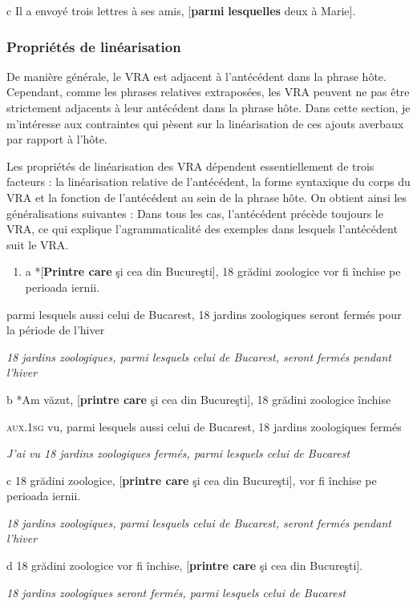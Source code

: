  c  Il a envoyé trois lettres à ses amis, [\textbf{parmi} \textbf{lesquelles} deux à Marie].

\subsubsection{Propriétés de linéarisation}
De manière générale, le VRA est adjacent à l'antécédent dans la phrase hôte. Cependant, comme les phrases relatives extraposées, les VRA peuvent ne pas être strictement adjacents à leur antécédent dans la phrase hôte. Dans cette section, je m'intéresse aux contraintes qui pèsent sur la linéarisation de ces ajouts averbaux par rapport à l'hôte.

Les propriétés de linéarisation des VRA dépendent essentiellement de trois facteurs : la linéarisation relative de l'antécédent, la forme syntaxique du corps du VRA et la fonction de l'antécédent au sein de la phrase hôte. On obtient ainsi les généralisations suivantes : Dans tous les cas, l'antécédent précède toujours le VRA, ce qui explique l'agrammaticalité des exemples dans lesquels l'antécédent suit le VRA.


\begin{enumerate}
\item a  *[\textbf{Printre care} şi cea din Bucureşti], 18 grădini zoologice vor fi închise pe perioada iernii. 


\end{enumerate}
parmi lesquels aussi celui de Bucarest, 18 jardins zoologiques seront fermés pour la période de l'hiver

{\itshape
18 jardins zoologiques, parmi lesquels celui de Bucarest, seront fermés pendant l'hiver} 

  b  *Am văzut, [\textbf{printre care} şi cea din Bucureşti], 18 grădini zoologice închise

    \textsc{aux.1sg} vu, parmi lesquels aussi celui de Bucarest, 18 jardins zoologiques fermés

    \textit{J'ai vu 18 jardins zoologiques fermés, parmi lesquels celui de Bucarest} 

  c  18 grădini zoologice, [\textbf{printre care} şi cea din Bucureşti], vor fi închise pe perioada iernii.

{\itshape
18 jardins zoologiques, parmi lesquels celui de Bucarest, seront fermés pendant l'hiver} 

  d  18 grădini zoologice vor fi închise, [\textbf{printre care} şi cea din Bucureşti].

{\itshape
18 jardins zoologiques seront fermés, parmi lesquels celui de Bucarest}


